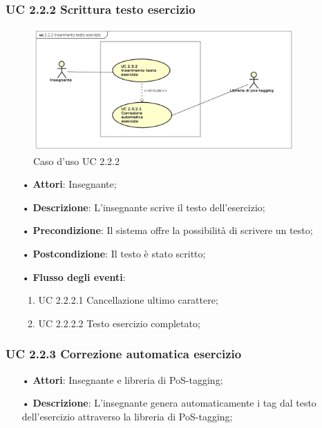 \subsubsection{UC 2.2.2 Scrittura testo esercizio}

\begin{figure}[H]
	\centering
	\includegraphics[width=10cm]{img/UC222.png} 
	\caption{Caso d'uso UC 2.2.2}
\end{figure}

\begin{itemize}
	\item[•] \textbf{Attori}: Insegnante;
	\item[•] \textbf{Descrizione}: L'insegnante scrive il testo dell’esercizio;
	\item[•] \textbf{Precondizione}: Il sistema offre la possibilità di scrivere un testo;
	\item[•] \textbf{Postcondizione}: Il testo è stato scritto;
	\item[•] \textbf{Flusso degli eventi}:
	\begin{enumerate}
		\item UC 2.2.2.1 Cancellazione ultimo carattere;
		\item UC 2.2.2.2 Testo esercizio completato;
	\end{enumerate}
\end{itemize}


\subsubsection{UC 2.2.3	Correzione automatica esercizio}
\begin{itemize}
	\item[•] \textbf{Attori}: Insegnante e libreria di {PoS-tagging};
	\item[•] \textbf{Descrizione}: L’insegnante genera automaticamente i tag dal testo dell’esercizio attraverso la libreria di PoS-tagging;
\end{itemize}

